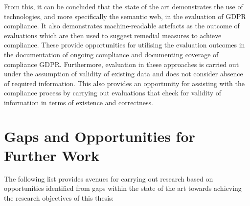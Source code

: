 From this, it can be concluded that the state of the art demonstrates the use of technologies, and more specifically the semantic web, in the evaluation of GDPR compliance. It also demonstrates machine-readable artefacts as the outcome of evaluations which are then used to suggest remedial measures to achieve compliance. These provide opportunities for utilising the evaluation outcomes in the documentation of ongoing compliance and documenting coverage of compliance GDPR. Furthermore, evaluation in these approaches is carried out under the assumption of validity of existing data and does not consider absence of required information. This also provides an opportunity for assisting with the compliance process by carrying out evaluations that check for validity of information in terms of existence and correctness.

\section{Gaps and Opportunities for Further Work}
The following list provides avenues for carrying out research based on opportunities identified from gaps within the state of the art towards achieving the research objectives of this thesis:
